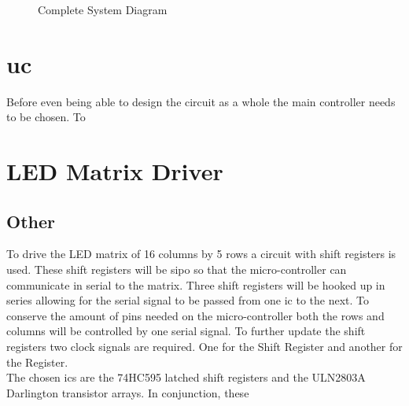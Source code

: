 \documentclass[12pt,a4paper]{report}
\begin{document}
\begin{figure}

\caption{Complete System Diagram}
\end{figure}

\section{\ac{uc}}
Before even being able to design the circuit as a whole the main controller needs to be chosen. To 
\section{LED Matrix Driver}

\subsection{Other}
To drive the LED matrix of 16 columns by 5 rows a circuit with shift registers is used. These shift registers will be \ac{sipo} so that the micro-controller can communicate in serial to the matrix. Three shift registers will be hooked up in series allowing for the serial signal to be passed from one \ac{ic} to the next. To conserve the amount of pins needed on the micro-controller both the rows and columns will be controlled by one serial signal. To further update the shift registers two clock signals are required. One for the Shift Register and another for the Register. \\
The chosen \acp{ic} are the 74HC595 latched shift registers and the ULN2803A Darlington transistor arrays. In conjunction, these 
\end{document}
